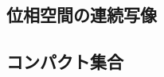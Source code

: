 \documentclass[../sotsu.tex]{subfiles}
\begin{document}
\subsection{位相空間の連続写像}




\subsection{コンパクト集合}







\end{document}
